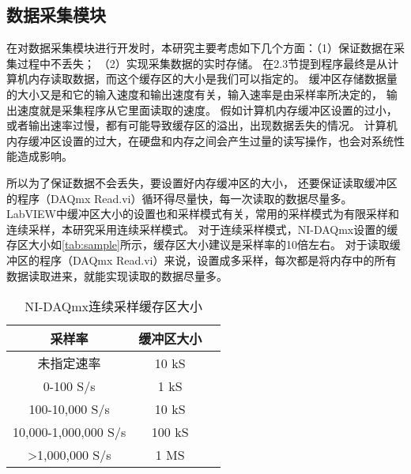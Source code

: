 \begin{comment}
\subsection{系统设置模块}
软件界面的设置模块提供了测试系统各项参数设定，包括采集通道设置、采样参数设置、
传感器灵敏度设置、分析参数设置等。
\begin{figure}[htbp]
    \centering
    \texttt{[image: 2系统设置.png]}
    \caption{\label{fig:setting}系统设置}
\end{figure}
\end{comment}

\subsection{数据采集模块}
在对数据采集模块进行开发时，本研究主要考虑如下几个方面：（1）保证数据在采集过程中不丢失；
（2）实现采集数据的实时存储。
在2.3节提到程序最终是从计算机内存读取数据，而这个缓存区的大小是我们可以指定的。
缓冲区存储数据量的大小又是和它的输入速度和输出速度有关，输入速率是由采样率所决定的，
输出速度就是采集程序从它里面读取的速度。
假如计算机内存缓冲区设置的过小，或者输出速率过慢，都有可能导致缓存区的溢出，出现数据丢失的情况。
计算机内存缓冲区设置的过大，在硬盘和内存之间会产生过量的读写操作，也会对系统性能造成影响。

所以为了保证数据不会丢失，要设置好内存缓冲区的大小，
还要保证读取缓冲区的程序（DAQmx Read.vi）循环得尽量快，每一次读取的数据尽量多。
LabVIEW中缓冲区大小的设置也和采样模式有关，常用的采样模式为有限采样和连续采样，本研究采用连续采样模式。
对于连续采样模式，NI-DAQmx设置的缓存区大小如\autoref{tab:sample}所示，缓存区大小建议是采样率的10倍左右。
对于读取缓冲区的程序（DAQmx Read.vi）来说，设置成多采样，每次都是将内存中的所有数据读取进来，就能实现读取的数据尽量多。
\begin{table}[htbp]
    \centering
    \caption{\label{tab:sample}NI-DAQmx连续采样缓存区大小}
    \begin{tabular}{ccc}
     \toprule
     采样率&缓冲区大小\\
     \midrule
     未指定速率&10 kS\\
     0-100 S/s&1 kS\\
     100-10,000 S/s&10 kS\\
     10,000-1,000,000 S/s&100 kS\\
     >1,000,000 S/s&1 MS\\
     \bottomrule
    \end{tabular}
\end{table}

